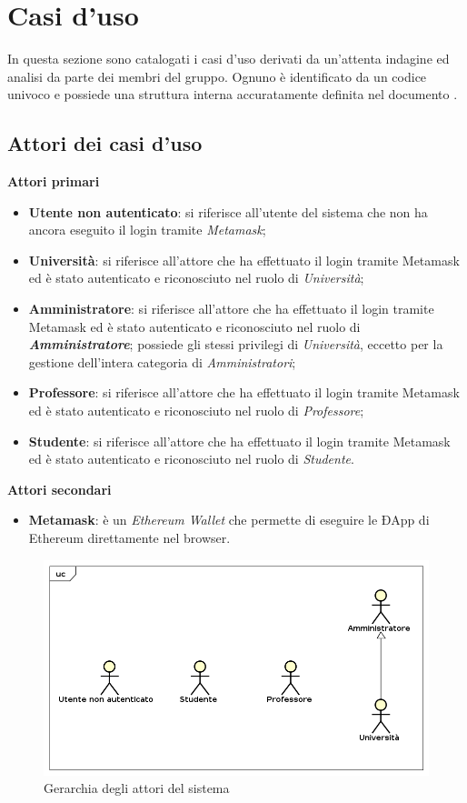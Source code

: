 \section{Casi d'uso}
In questa sezione sono catalogati i casi d'uso derivati da un'attenta indagine ed analisi da parte dei membri del gruppo. Ognuno è identificato da un codice univoco e possiede una struttura interna accuratamente definita nel documento \NdP{}.
\subsection{Attori dei casi d'uso}
\textbf{Attori primari}
	\begin{itemize}
		\item \textbf{Utente non autenticato}: si riferisce all'utente del sistema che non ha ancora eseguito il login tramite \emph{Metamask};
		\item \textbf{Università}: si riferisce all'attore che ha effettuato il login tramite Metamask ed è stato autenticato e riconosciuto nel ruolo di \emph{Università};
		\item \textbf{Amministratore}: si riferisce all'attore che ha effettuato il login tramite Metamask ed è stato autenticato e riconosciuto nel ruolo di \emph\textbf{{Amministratore}}; possiede gli stessi privilegi di \emph{Università}, eccetto per la gestione dell'intera categoria di \emph{Amministratori};
		\item \textbf{Professore}: si riferisce all'attore che ha effettuato il login tramite Metamask ed è stato autenticato e riconosciuto nel ruolo di \emph{Professore};
		\item \textbf{Studente}: si riferisce all'attore che ha effettuato il login tramite Metamask ed è stato autenticato e riconosciuto nel ruolo di \emph{Studente}.
	\end{itemize}

\textbf{Attori secondari}
	\begin{itemize}
		\item \textbf{Metamask}: è un \emph{Ethereum Wallet} che permette di eseguire le ÐApp di Ethereum direttamente nel browser.
	\end{itemize}
\begin{figure} [H]
	\centering
	\includegraphics[scale=0.4]{./img/Attori.png}
	\caption{Gerarchia degli attori del sistema }\label{}
\end{figure}

